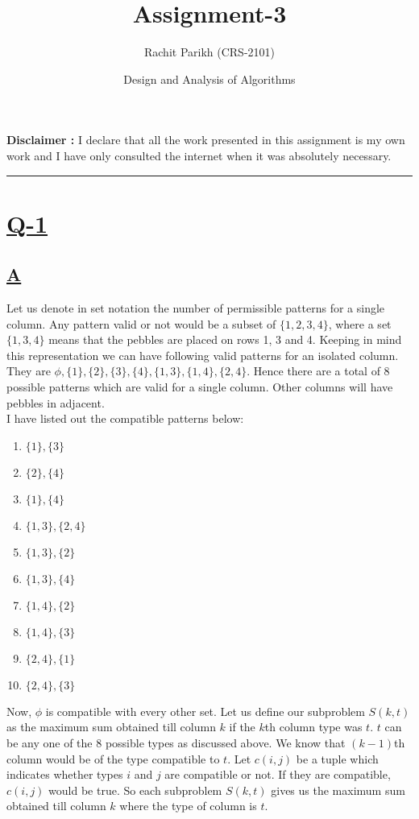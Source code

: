 \documentclass[14pt]{article}
\begin{document}
	
	\title{\color{blue}\Huge \textbf{Assignment-3}} 
	\date{\Large Design and Analysis of Algorithms}
	\author{Rachit Parikh (CRS-2101)}
	
	\maketitle
	\textbf{Disclaimer :} I declare that all the work presented in this assignment is my own work and I have only consulted the internet when it was absolutely necessary.
	
	\noindent
	\rule{\linewidth}{0.4pt}
	
	\section*{\underline{Q-1}}
		\noindent
			\subsection*{\underline{A}}	
				\noindent
				\newline
				Let us denote in set notation the number of permissible patterns for a single column. Any pattern valid or not would be a subset of $\{1, 2, 3, 4\}$, where a set $\{1, 3, 4\}$ means that the pebbles are placed on rows 1, 3 and 4. Keeping in mind this representation we can have following valid patterns for an isolated column. They are $\phi, \{1\}, \{2\}, \{3\}, \{4\}, \{1, 3\}, \{1, 4\}, \{2, 4\}$. Hence there are a total of 8 possible patterns which are valid for a single column. Other columns will have pebbles in adjacent.\\
				\newline
				I have listed out the compatible patterns below:
				\begin{enumerate}
					\item $\{1\}, \{3\}$
					\item $\{2\},  \{4\}$
					\item $\{1\}, \{4\}$
					\item $\{1, 3\}, \{2, 4\}$
					\item $\{1, 3\}, \{2\}$
					\item $\{1, 3\}, \{4\}$
					\item $\{1, 4\}, \{2\}$
					\item $\{1, 4\}, \{3\}$
					\item $\{2, 4\}, \{1\}$
					\item $\{2, 4\}, \{3\}$
				\end{enumerate}
			Now, $\phi$ is compatible with every other set. Let us define our subproblem $S(k, t)$ as the maximum sum obtained till column $k$ if the $k$th column type was $t$. $t$ can be any one of the 8 possible types as discussed above. We know that $(k-1)$th column would be of the type compatible to $t$. Let $c(i, j)$ be a tuple which indicates whether types $i$ and $j$ are compatible or not. If they are compatible, $c(i, j)$ would be true. So each subproblem $S(k, t)$ gives us the maximum sum obtained till column $k$ where the type of column is $t$. 
\end{document}
